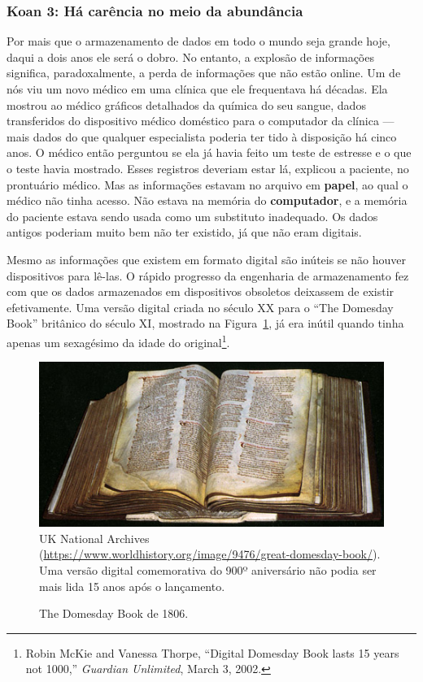 \subsubsection*{Koan 3: Há carência no meio da abundância}
Por mais que o armazenamento de dados em todo o mundo seja grande hoje, daqui a
dois anos ele será o dobro. No entanto, a explosão de informações significa, 
paradoxalmente, a perda de informações que não estão online. Um de nós viu um 
novo médico em uma clínica que ele frequentava há décadas. Ela mostrou ao médico
gráficos detalhados da química do seu sangue, dados transferidos do dispositivo
médico doméstico para o computador da clínica --- mais dados do que qualquer
especialista poderia ter tido à disposição há cinco anos. O médico então
perguntou se ela já havia feito um teste de estresse e o que o teste havia 
mostrado. Esses registros deveriam estar lá, explicou a paciente, no prontuário
médico. Mas as informações estavam no arquivo em \textbf{papel}, ao qual o 
médico não tinha acesso. Não estava na memória do \textbf{computador}, e a
memória do paciente estava sendo usada como um substituto inadequado. Os dados
antigos poderiam muito bem não ter existido, já que não eram digitais.

Mesmo as informações que existem em formato digital são inúteis se não houver 
dispositivos para lê-las. O rápido progresso da engenharia de armazenamento fez 
com que os dados armazenados em dispositivos obsoletos deixassem de existir 
efetivamente. Uma versão digital criada no século XX para o ``The Domesday Book''
britânico do século XI, mostrado na Figura~\ref{fig:domesday}, já era inútil
quando tinha apenas um sexagésimo da idade do original\footnote{Robin McKie and
Vanessa Thorpe, ``Digital Domesday Book lasts 15 years not 1000,''
\textit{Guardian Unlimited}, March 3, 2002.}.

\begin{figure}[h]
\centering
\caption{The Domesday Book de 1806.}
\label{fig:domesday}
\vspace{-0.3cm}
\includegraphics[scale=0.5]{imagens/domesday.jpg}
\\
\scriptsize{UK National Archives
(\url{https://www.worldhistory.org/image/9476/great-domesday-book/}). Uma versão
digital comemorativa do 900º aniversário não podia ser mais lida 15 anos após
o lançamento.}
\end{figure}

